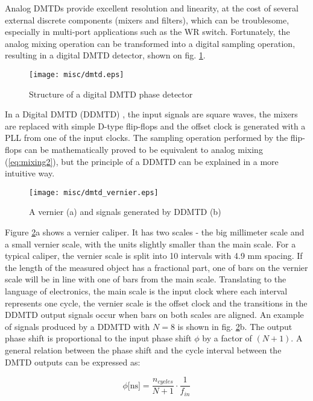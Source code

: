Analog DMTDs provide excellent resolution and linearity, at the cost of several
external discrete components (mixers and filters), which can be troublesome,
especially in multi-port applications such as the WR switch. Fortunately, the
analog mixing operation can be transformed into a digital sampling operation,
resulting in a digital DMTD detector, shown on fig. \ref{fig:digital_dmtd}.
\begin{figure}[ht!]
  \centering
  \texttt{[image: misc/dmtd.eps]}
  \caption{Structure of a digital DMTD phase detector}
  \label{fig:digital_dmtd}
\end{figure}
In a Digital DMTD (DDMTD) \cite{icalepcs09}, the input signals are square
waves, the mixers are replaced with simple D-type flip-flops and the offset
clock is generated with a PLL from one of the input clocks. The sampling
operation performed by the flip-flops can be mathematically proved to be
equivalent to analog mixing (\ref{eq:mixing2}), but the principle of a DDMTD
can be explained in a more intuitive way.
\begin{figure}[ht!]
  \centering
  \texttt{[image: misc/dmtd\_vernier.eps]}
  \caption{A vernier (a) and signals generated by DDMTD (b)}
  \label{fig:dmtd_vernier}
\end{figure}
Figure \ref{fig:dmtd_vernier}a shows a vernier caliper. It has two scales -
the big millimeter scale and a small vernier scale, with the units slightly
smaller than the main scale. For a typical caliper, the vernier scale is split
into 10 intervals with 4.9 mm spacing. If the length of the measured object
has a fractional part, one of bars on the vernier scale will be in line with
one of bars from the main scale. Translating to the language of electronics,
the main scale is the input clock where each interval represents one cycle,
the vernier scale is the offset clock and the transitions in the DDMTD output
signals occur when bars on both scales are aligned. An example of signals
produced by a DDMTD with $N = 8$ is shown in fig. \ref{fig:dmtd_vernier}b. The
output phase shift is proportional to the input phase shift $\phi$ by a
factor of $(N+1)$. A general relation between the phase shift and the cycle
interval between the DMTD outputs can be expressed as:

\begin{equation}
\label{eq:dmtd1}
\phi \mbox{[ns]} = \frac{n_{cycles}}{N+1} \cdot \frac{1}{f_{in}}
\end{equation}


